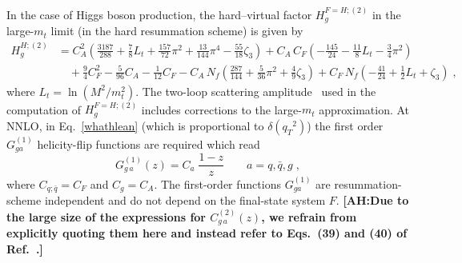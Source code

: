 \documentclass[12pt]{article}
\DeclareRobustCommand{\nn}{\nonumber}
\DeclareRobustCommand{\AH}[1]{\textbf{\quad\color{purple}[AH:\quad #1]}\xspace}
\DeclareRobustCommand{\qt}{\ensuremath{q_T}\xspace}
\begin{document}
\begin{appendix}
In the case of Higgs boson production, the hard--virtual factor $H^{F=H;(2)}_{g}$ in the large-$m_t$ limit (in the hard resummation scheme) is given by~\cite{Catani:2011kr}
\begin{align}
  H_g^{H;(2)} &=
  C_A^2 \left(
    \frac{3187}{288}+\frac{7}{8}L_t+\frac{157}{72}\pi^2+\frac{13}{144}\pi^4-\frac{55}{18}\zeta_3
  \right)
  +C_A\, C_F \left( -\frac{145}{24}-\frac{11}{8}L_t-\frac{3}{4}\pi^2\right)
  \nn\\&\quad
  +\frac{9}{4}C_F^2 -\frac{5}{96}C_A-\frac{1}{12}C_F-C_A\, N_f\left(\frac{287}{144}+\frac{5}{36}\pi^2+\frac{4}{9}\zeta_3\right)
  +C_F\, N_f\left(-\frac{41}{24}+\frac{1}{2}L_t+\zeta_3\right) \;,
  \label{H2g}
\end{align}
where $L_t=\ln (M^2/m_t^2)$. The two-loop scattering amplitude~\cite{Harlander:2009bw}  used in the computation of  $H^{F=H;(2)}_{g}$ includes corrections to the large-$m_t$ approximation.
At NNLO, in Eq.~\eqref{whathlean} (which is proportional to $\delta(\qt^{2})$) the first order $G_{ga}^{(1)}$ helicity-flip functions are required which read~\cite{Catani:2010pd}
\begin{equation}
  G_{g \,a}^{(1)}(z) = C_a \;\frac{1-z}{z} \qquad a=q,\bar{q},g \; ,
\end{equation}
where $C_{q;\bar{q}}=C_{F}$ and $C_g=C_{A}$. The first-order functions $G_{ga}^{(1)}$ are resummation-scheme independent and do not depend on the final-state system $F$.
\AH{Due to the large size of the expressions for $C_{g \,a}^{(2)}(z)$, we refrain from explicitly quoting them here and instead refer to Eqs.~(39) and (40) of Ref.~\cite{Catani:2013tia}.}


\end{appendix}
\end{document}
